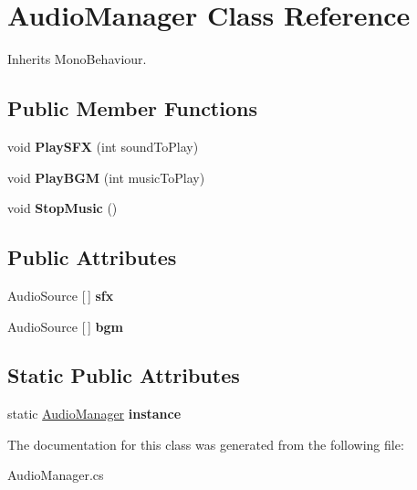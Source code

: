 \hypertarget{class_audio_manager}{}\section{Audio\+Manager Class Reference}
\label{class_audio_manager}


Inherits Mono\+Behaviour.

\subsection*{Public Member Functions}
\begin{DoxyCompactItemize}
\item 
\mbox{\label{class_audio_manager_aa07a3000261565691928876720c473a9}} 
void {\bfseries Play\+S\+FX} (int sound\+To\+Play)
\item 
\mbox{\label{class_audio_manager_a429911aa44b9a7b71560a4d6bb86c1b9}} 
void {\bfseries Play\+B\+GM} (int music\+To\+Play)
\item 
\mbox{\label{class_audio_manager_aa3da61250948e1881a7c3993cf9e5af3}} 
void {\bfseries Stop\+Music} ()
\end{DoxyCompactItemize}
\subsection*{Public Attributes}
\begin{DoxyCompactItemize}
\item 
\mbox{\label{class_audio_manager_ac62451216ffa20cac3c439a0a9b79e50}} 
Audio\+Source \mbox{[}$\,$\mbox{]} {\bfseries sfx}
\item 
\mbox{\label{class_audio_manager_a286b9553aa2c2cad8fac6b27961ba2d7}} 
Audio\+Source \mbox{[}$\,$\mbox{]} {\bfseries bgm}
\end{DoxyCompactItemize}
\subsection*{Static Public Attributes}
\begin{DoxyCompactItemize}
\item 
\mbox{\label{class_audio_manager_a22b1b1a94ee423ccb2b142b4f5a70ad4}} 
static \mbox{\hyperlink{class_audio_manager}{Audio\+Manager}} {\bfseries instance}
\end{DoxyCompactItemize}


The documentation for this class was generated from the following file\+:\begin{DoxyCompactItemize}
\item 
Audio\+Manager.\+cs\end{DoxyCompactItemize}
